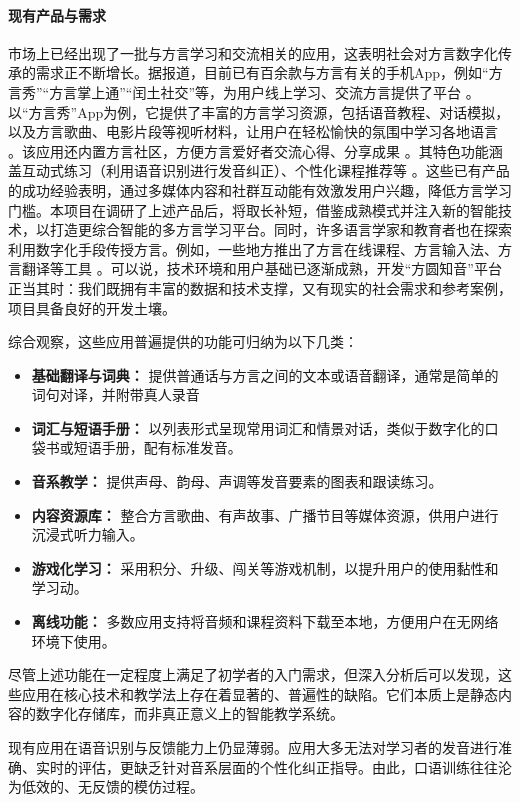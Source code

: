 \paragraph{现有产品与需求}
市场上已经出现了一批与方言学习和交流相关的应用，这表明社会对方言数字化传承的需求正不断增长。据报道，目前已有百余款与方言有关的手机App，例如“方言秀”“方言掌上通”“闰土社交”等，为用户线上学习、交流方言提供了平台 。以“方言秀”App为例，它提供了丰富的方言学习资源，包括语音教程、对话模拟，以及方言歌曲、电影片段等视听材料，让用户在轻松愉快的氛围中学习各地语言 。该应用还内置方言社区，方便方言爱好者交流心得、分享成果 。其特色功能涵盖互动式练习（利用语音识别进行发音纠正）、个性化课程推荐等 。这些已有产品的成功经验表明，通过多媒体内容和社群互动能有效激发用户兴趣，降低方言学习门槛。本项目在调研了上述产品后，将取长补短，借鉴成熟模式并注入新的智能技术，以打造更综合智能的多方言学习平台。同时，许多语言学家和教育者也在探索利用数字化手段传授方言。例如，一些地方推出了方言在线课程、方言输入法、方言翻译等工具 。可以说，技术环境和用户基础已逐渐成熟，开发“方圆知音”平台正当其时：我们既拥有丰富的数据和技术支撑，又有现实的社会需求和参考案例，项目具备良好的开发土壤。

综合观察，这些应用普遍提供的功能可归纳为以下几类：
\begin{itemize}
    \item \textbf{基础翻译与词典：} 提供普通话与方言之间的文本或语音翻译，通常是简单的词句对译，并附带真人录音
    \item \textbf{词汇与短语手册：} 以列表形式呈现常用词汇和情景对话，类似于数字化的口袋书或短语手册，配有标准发音。
    \item \textbf{音系教学：} 提供声母、韵母、声调等发音要素的图表和跟读练习。
    \item \textbf{内容资源库：} 整合方言歌曲、有声故事、广播节目等媒体资源，供用户进行沉浸式听力输入。
    \item \textbf{游戏化学习：} 采用积分、升级、闯关等游戏机制，以提升用户的使用黏性和学习动。
    \item \textbf{离线功能：} 多数应用支持将音频和课程资料下载至本地，方便用户在无网络环境下使用。
\end{itemize}

尽管上述功能在一定程度上满足了初学者的入门需求，但深入分析后可以发现，这些应用在核心技术和教学法上存在着显著的、普遍性的缺陷。它们本质上是静态内容的数字化存储库，而非真正意义上的智能教学系统。

现有应用在语音识别与反馈能力上仍显薄弱。应用大多无法对学习者的发音进行准确、实时的评估，更缺乏针对音系层面的个性化纠正指导。由此，口语训练往往沦为低效的、无反馈的模仿过程。

